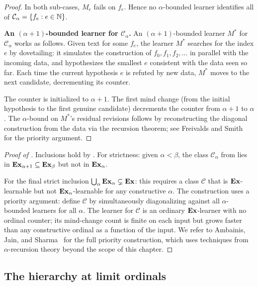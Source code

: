 \begin{proof}
In both sub-cases, $M_e$ fails on $f_e$.  Hence no $\alpha$-bounded
learner identifies all of $\mathcal{C}_\alpha = \{f_e : e \in \mathbb{N}\}$.

\medskip
\textbf{An $(\alpha+1)$-bounded learner for $\mathcal{C}_\alpha$.}
An $(\alpha+1)$-bounded learner $M^*$ for $\mathcal{C}_\alpha$ works
as follows.  Given text for some $f_e$, the learner $M^*$ searches
for the index $e$ by dovetailing: it simulates the construction of
$f_0, f_1, f_2, \ldots$ in parallel with the incoming data, and
hypothesizes the smallest $e$ consistent with the data seen so far.
Each time the current hypothesis $e$ is refuted by new data, $M^*$
moves to the next candidate, decrementing its counter.

The counter is initialized to $\alpha + 1$.  The first mind change
(from the initial hypothesis to the first genuine candidate)
decrements the counter from $\alpha + 1$ to $\alpha$.  The
$\alpha$-bound on $M^*$'s residual revisions follows by reconstructing
the diagonal construction from the data via the recursion theorem; see
Freivalds and Smith~\cite{FreivaldsSmith1993} for the priority argument.
\end{proof}

\begin{proof}[Proof of ]
Inclusions hold by .  For strictness: given
$\alpha < \beta$, the class $\mathcal{C}_\alpha$ from
 lies in $\mathbf{Ex}_{\alpha+1} \subseteq \mathbf{Ex}_\beta$ but
not in $\mathbf{Ex}_\alpha$.

For the final strict inclusion $\bigcup_\alpha \mathbf{Ex}_\alpha \subsetneq
\mathbf{Ex}$: this requires a class $\mathcal{C}$ that is $\mathbf{Ex}$-learnable but
not $\mathbf{Ex}_\alpha$-learnable for any constructive $\alpha$.  The
construction uses a priority argument: define $\mathcal{C}$ by
simultaneously diagonalizing against all $\alpha$-bounded learners
for all $\alpha$.  The learner for $\mathcal{C}$ is an ordinary
$\mathbf{Ex}$-learner with no ordinal counter; its mind-change count is finite
on each input but grows faster than any constructive ordinal as a
function of the input.  We refer to Ambainis, Jain, and
Sharma~\cite{AmbainisJainSharma1999} for the full priority construction,
which uses techniques from $\alpha$-recursion theory beyond the scope
of this chapter.
\end{proof}


\subsection{The hierarchy at limit ordinals}

